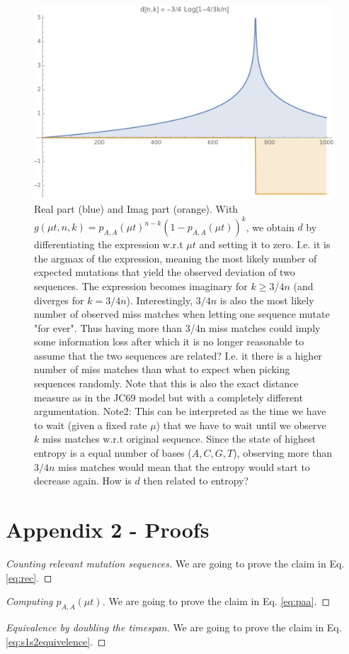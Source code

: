 \documentclass[12pt]{article}
\begin{document}
\begin{figure}
	\centering
	\includegraphics[width=1.0\linewidth]{distancemeasure}
	\caption{Real part (blue) and Imag part (orange). With $g(\mu t,n,k) = p_{A,A}(\mu t)^{n-k} (1-p_{A,A}(\mu t))^k$, we obtain $d$ by differentiating the expression w.r.t $\mu t$ and setting it to zero. I.e. it is the argmax of the expression, meaning the most likely number of expected mutations that yield the observed deviation of two sequences. The expression becomes imaginary for $k\geq 3/4n$ (and diverges for $k=3/4n$). Interestingly, $3/4n$ is also the most likely number of observed miss matches when letting one sequence mutate "for ever". Thus having more than 3/4n miss matches could imply some information loss after which it is no longer reasonable to assume that the two sequences are related? I.e. it there is a higher number of miss matches than what to expect when picking sequences randomly. {\color{red}Note that this is also the exact distance measure as in the JC69 model but with a completely different argumentation.}
	Note2: This can be interpreted as the time we have to wait (given a fixed rate $\mu$) that we have to wait until we observe $k$ miss matches w.r.t original sequence. Since the state of highest entropy is a equal number of bases ($A,C,G,T$), observing more than $3/4n$ miss matches would mean that the entropy would start to decrease again. How is $d$ then related to entropy? }
	\label{fig:distancemeasure}
\end{figure}
\FloatBarrier
\section{Appendix 2 - Proofs}
\begin{proof}[Counting relevant mutation sequences]
	We are going to prove the claim in Eq. \eqref{eq:rec}. 
\end{proof}
\begin{proof}[Computing $p_{A,A}(\mu t)$]
	We are going to prove the claim in Eq. \eqref{eq:paa}.
\end{proof}

\begin{proof}[Equivalence by doubling the timespan]
	We are going to prove the claim in Eq. \eqref{eq:s1s2equivelence}.
	
\end{proof}
\end{document}

